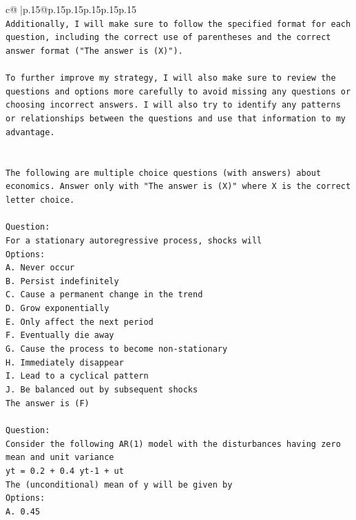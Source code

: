 \documentclass{article}
\begin{document}
{\begin{supertabular}{c@{$\;$}|p{.15\linewidth}@{}p{.15\linewidth}p{.15\linewidth}p{.15\linewidth}p{.15\linewidth}p{.15\linewidth}}
{{{\\ 
\texttt{Additionally, I will make sure to follow the specified format for each question, including the correct use of parentheses and the correct answer format ("The answer is (X)").} \\
\\ 
\texttt{To further improve my strategy, I will also make sure to review the questions and options more carefully to avoid missing any questions or choosing incorrect answers. I will also try to identify any patterns or relationships between the questions and use that information to my advantage.} \\
\\ 
\\ 
\texttt{The following are multiple choice questions (with answers) about economics. Answer only with "The answer is (X)" where X is the correct letter choice.} \\
\\ 
\texttt{Question:} \\
\texttt{For a stationary autoregressive process, shocks will} \\
\texttt{Options:} \\
\texttt{A. Never occur} \\
\texttt{B. Persist indefinitely} \\
\texttt{C. Cause a permanent change in the trend} \\
\texttt{D. Grow exponentially} \\
\texttt{E. Only affect the next period} \\
\texttt{F. Eventually die away} \\
\texttt{G. Cause the process to become non{-}stationary} \\
\texttt{H. Immediately disappear} \\
\texttt{I. Lead to a cyclical pattern} \\
\texttt{J. Be balanced out by subsequent shocks} \\
\texttt{The answer is (F)} \\
\\ 
\texttt{Question:} \\
\texttt{Consider the following AR(1) model with the disturbances having zero mean and unit variance} \\
\texttt{yt = 0.2 + 0.4 yt{-}1 + ut} \\
\texttt{The (unconditional) mean of y will be given by} \\
\texttt{Options:} \\
\texttt{A. 0.45} \\
}}}
\end{supertabular}}
\end{document}
